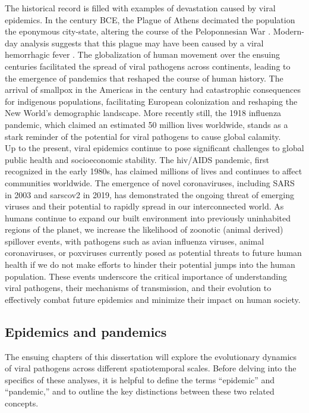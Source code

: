 The historical record is filled with examples of devastation caused by viral epidemics.
In the  century BCE, the Plague of Athens decimated the population the eponymous city-state, altering the course of the Peloponnesian War \citep{thucydides}.
Modern-day analysis suggests that this plague may have been caused by a viral hemorrhagic fever \citep{olson1996thucydides}.
The globalization of human movement over the ensuing centuries facilitated the spread of viral pathogens across continents, leading to the emergence of pandemics that reshaped the course of human history.
The arrival of smallpox in the Americas in the  century had catastrophic consequences for indigenous populations, facilitating European colonization and reshaping the New World's demographic landscape.
More recently still, the 1918 influenza pandemic, which claimed an estimated 50 million lives worldwide, stands as a stark reminder of the potential for viral pathogens to cause global calamity.\\

Up to the present, viral epidemics continue to pose significant challenges to global public health and socioeconomic stability.
The \gls{hiv}/AIDS pandemic, first recognized in the early 1980s, has claimed millions of lives and continues to affect communities worldwide.
The emergence of novel coronaviruses, including SARS in 2003 and \gls{sarscov2} in 2019, has demonstrated the ongoing threat of emerging viruses and their potential to rapidly spread in our interconnected world.
As humans continue to expand our built environment into previously uninhabited regions of the planet, we increase the likelihood of zoonotic (animal derived) spillover events, with pathogens such as avian influenza viruses, animal coronaviruses, or poxviruses currently posed as potential threats to future human health if we do not make efforts to hinder their potential jumps into the human population.
These events underscore the critical importance of understanding viral pathogens, their mechanisms of transmission, and their evolution to effectively combat future epidemics and minimize their impact on human society.\\

\subsection{Epidemics and pandemics}\label{sec:epidemicsVsPandemics}
The ensuing chapters of this dissertation will explore the evolutionary dynamics of viral pathogens across different spatiotemporal scales.
Before delving into the specifics of these analyses, it is helpful to define the terms ``epidemic'' and ``pandemic,'' and to outline the key distinctions between these two related concepts.\\

